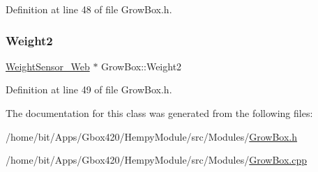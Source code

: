 Definition at line 48 of file Grow\+Box.\+h.

\mbox{\label{class_grow_box_a521e1b41c7a71bc44746c8dd1ab63476}} 
\subsubsection{\texorpdfstring{Weight2}{Weight2}}
{\footnotesize\ttfamily \hyperlink{class_weight_sensor___web}{Weight\+Sensor\+\_\+\+Web} $\ast$ Grow\+Box\+::\+Weight2}



Definition at line 49 of file Grow\+Box.\+h.



The documentation for this class was generated from the following files\+:\begin{DoxyCompactItemize}
\item 
/home/bit/\+Apps/\+Gbox420/\+Hempy\+Module/src/\+Modules/\hyperlink{_hempy_module_2src_2_modules_2_grow_box_8h}{Grow\+Box.\+h}\item 
/home/bit/\+Apps/\+Gbox420/\+Hempy\+Module/src/\+Modules/\hyperlink{_hempy_module_2src_2_modules_2_grow_box_8cpp}{Grow\+Box.\+cpp}\end{DoxyCompactItemize}
